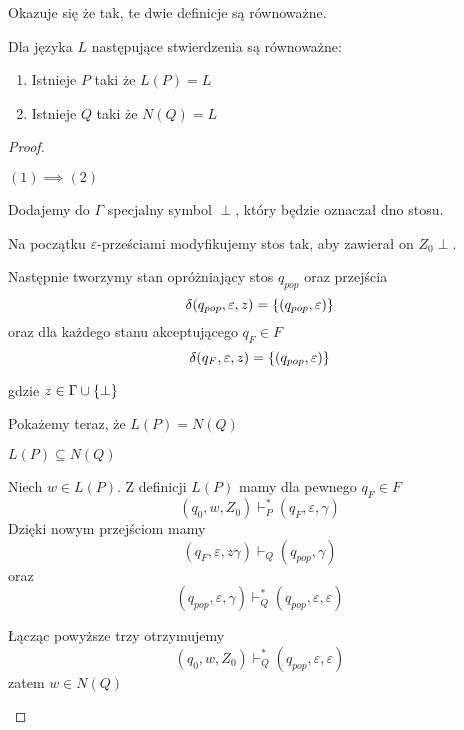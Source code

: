 Okazuje się że tak, te dwie definicje są równoważne.
\begin{theorem}
    \label{pda-type-equivalence}
    Dla języka \( L \) następujące stwierdzenia są równoważne:
    \begin{enumerate}
        \item Istnieje \( P \) taki że \( L(P) = L \)
        \item Istnieje \( Q \) taki że \( N(Q) = L \)
    \end{enumerate}
\end{theorem}
\begin{proof} \( \)

    \begin{description}
        \item \( (1) \implies (2) \)
        
        Dodajemy do \( \Gamma \) specjalny symbol \( \perp \), który będzie oznaczał dno stosu.
        
        Na początku \( \varepsilon \)-prześciami modyfikujemy stos tak, aby zawierał on \( Z_0\perp \).
        
        
        Następnie tworzymy stan opróżniający stos \( q_{pop} \) oraz przejścia 
        \[
            \delta(q_{pop}, \varepsilon, z) = \set{(q_{pop}, \varepsilon)}
        \]
        oraz dla każdego stanu akceptującego \( q_F \in F \)
        \[
            \delta(q_F, \varepsilon, z) = \set{(q_{pop}, \varepsilon)}
        \]
        
        gdzie \( z \in \Gamma\cup \set{\perp} \)
        
        Pokażemy teraz, że \( L(P) = N(Q) \)
        \begin{description}
            \item \( L(P) \subseteq N(Q) \)
            
            Niech \( w \in L(P) \). Z definicji \( L(P) \) mamy dla pewnego \( q_F \in F \)
            \[
                (q_0, w, Z_0) \vdash_P^* (q_F, \varepsilon, \gamma)
            \]
            Dzięki nowym przejściom mamy
            \[
                (q_F, \varepsilon, z\gamma) \vdash_Q (q_{pop}, \gamma)
            \]
            oraz
            \[
                (q_{pop}, \varepsilon, \gamma) \vdash_Q^* (q_{pop}, \varepsilon, \varepsilon)
            \]
            
            Łącząc powyższe trzy otrzymujemy
            \[
                (q_0, w, Z_0) \vdash_Q^* (q_{pop}, \varepsilon, \varepsilon)
            \]
            zatem \( w \in N(Q) \)
            

\end{description}
\end{description}
\end{proof}
